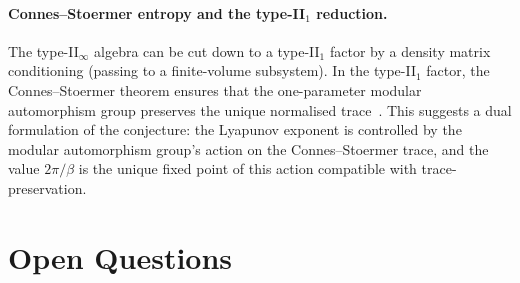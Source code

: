\documentclass[12pt,a4paper]{article}
\begin{document}
\paragraph{Connes--Stoermer entropy and the type-II$_1$ reduction.}
The type-II$_\infty$ algebra can be cut down to a type-II$_1$
factor by a density matrix conditioning (passing to a finite-volume
subsystem).
In the type-II$_1$ factor, the Connes--Stoermer theorem ensures that
the one-parameter modular automorphism group preserves the unique
normalised trace~\cite{ConnesRovelli1994}.
This suggests a dual formulation of the conjecture: the Lyapunov
exponent is controlled by the modular automorphism group's action on
the Connes--Stoermer trace, and the value $2\pi/\beta$ is the unique
fixed point of this action compatible with trace-preservation.

\section{Open Questions}
\label{sec:open}
\end{document}
